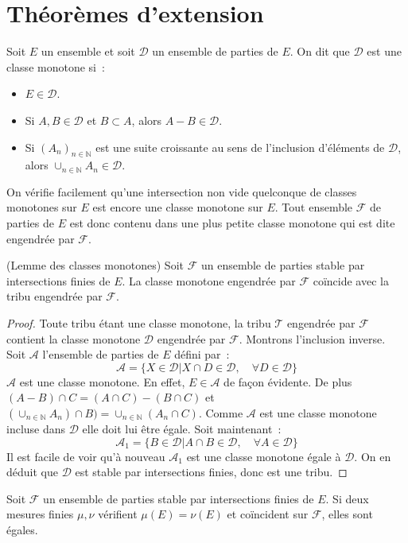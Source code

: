 \section{Théorèmes d'extension}
\begin{defn}
Soit $E$ un ensemble et soit $\mathcal{D}$ un ensemble de parties de
$E$. On dit que $\mathcal{D}$ est une classe monotone si~:
\begin{itemize}
\item $E \in \mathcal{D}$.
\item Si $A,B \in \mathcal{D}$ et $B \subset A$, alors $A-B \in
  \mathcal{D}$.
\item Si $(A_n)_{n \in \mathbb{N}}$ est une suite croissante au sens
  de l'inclusion d'éléments de $\mathcal{D}$,
  alors $\cup_{n \in \mathbb{N}}A_n \in \mathcal{D}$.
\end{itemize}
On vérifie facilement qu'une intersection non vide quelconque de
classes monotones sur $E$ est encore une classe monotone sur
$E$. Tout ensemble $\mathcal{F}$ de parties de $E$ est donc contenu
dans une plus petite classe monotone qui est dite engendrée par $\mathcal{F}$.
\begin{prop}{(Lemme des classes monotones)}
  Soit $\mathcal{F}$ un ensemble de parties stable par intersections
  finies de $E$. La classe monotone engendrée par $\mathcal{F}$ coïncide avec la
  tribu engendrée par $\mathcal{F}$. 
\end{prop}
\begin{proof}
Toute tribu étant une classe monotone, la tribu $\mathcal{T}$ engendrée par
$\mathcal{F}$ contient la classe monotone $\mathcal{D}$ engendrée par
$\mathcal{F}$. Montrons l'inclusion inverse. Soit $\mathcal{A}$ l'ensemble de
parties de $E$ défini par~:
\[
\mathcal{A} = \{ X \in \mathcal{D} | X \cap D \in \mathcal{D}, \quad  \forall D
\in
\mathcal{D} \}
\]
$\mathcal{A}$ est une classe monotone. En effet, $E \in \mathcal{A}$ de façon
évidente. De plus $(A-B) \cap C = (A\cap C) - (B\cap C)$ et $(\cup_{n
  \in \mathbb{N}}
A_n) \cap B) = \cup_{n \in \mathbb{N}}( A_n \cap C)$.
Comme $\mathcal{A}$ est une classe monotone incluse dans
$\mathcal{D}$ elle doit lui être égale.
Soit maintenant~:
\[
\mathcal{A}_1 = \{ B \in \mathcal{D} | A \cap B \in \mathcal{D}, \quad
\forall A \in \mathcal{D} \} 
\]
Il est facile de voir qu'à nouveau $\mathcal{A}_1$ est une classe monotone égale
à $\mathcal{D}$. On en déduit que $\mathcal{D}$ est stable par intersections finies, donc est une tribu.
\end{proof}
\begin{corollaire}
 Soit $\mathcal{F}$ un ensemble de parties stable par intersections
 finies de $E$. Si deux mesures finies $\mu,\nu$ vérifient $\mu(E) =
 \nu(E)$ et coïncident sur $\mathcal{F}$, elles sont égales.
\end{corollaire}
\end{defn}


